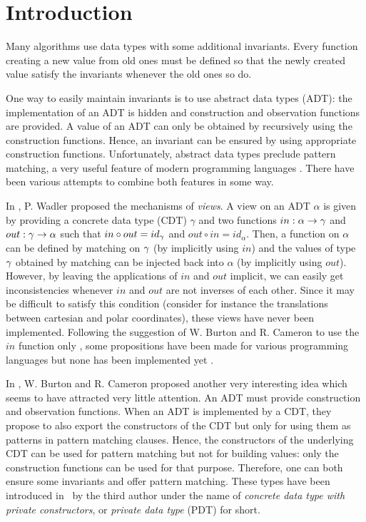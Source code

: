 \section{Introduction}

Many algorithms use data types with some additional invariants. Every
function creating a new value from old ones must be defined so that
the newly created value satisfy the invariants whenever the old ones
so do.

One way to easily maintain invariants is to use abstract data types
(ADT): the implementation of an ADT is hidden and construction and
observation functions are provided. A value of an ADT can only be
obtained by recursively using the construction functions. Hence, an
invariant can be ensured by using appropriate construction
functions. Unfortunately, abstract data types preclude pattern
matching, a very useful feature of modern programming languages
\cite{ocaml3.09,haskell03,moreau03cc,tom2.3}. There have been various
attempts to combine both features in some way.

In \cite{wadler87popl}, P. Wadler proposed the mechanisms of {\em
views}. A view on an ADT $\alpha$ is given by providing a concrete
data type (CDT) $\gamma$ and two functions $in:\alpha\rightarrow\gamma$ and
$out:\gamma\rightarrow\alpha$ such that $in\circ out=id_\gamma$ and $out\circ
in=id_\alpha$. Then, a function on $\alpha$ can be defined by matching
on $\gamma$ (by implicitly using $in$) and the values of type $\gamma$
obtained by matching can be injected back into $\alpha$ (by implicitly
using $out$). However, by leaving the applications of $in$ and $out$
implicit, we can easily get inconsistencies whenever $in$ and $out$
are not inverses of each other. Since it may be difficult to satisfy
this condition (consider for instance the translations between
cartesian and polar coordinates), these views have never been
implemented. Following the suggestion of W. Burton and R. Cameron to
use the $in$ function only \cite{burton93jfp}, some propositions have
been made for various programming languages but none has been
implemented yet \cite{burton96,okasaki98ml}.

In \cite{burton93jfp}, W. Burton and R. Cameron proposed another very
interesting idea which seems to have attracted very little
attention. An ADT must provide construction and observation
functions. When an ADT is implemented by a CDT, they propose to also
export the constructors of the CDT but only for using them as patterns
in pattern matching clauses. Hence, the constructors of the underlying
CDT can be used for pattern matching but not for building values: only
the construction functions can be used for that purpose. Therefore,
one can both ensure some invariants and offer pattern matching. These
types have been introduced in \ocaml\ by the third author
\cite{weis03} under the name of {\em concrete data type with private
constructors}, or {\em private data type} (PDT) for short.\vsp[2mm]

